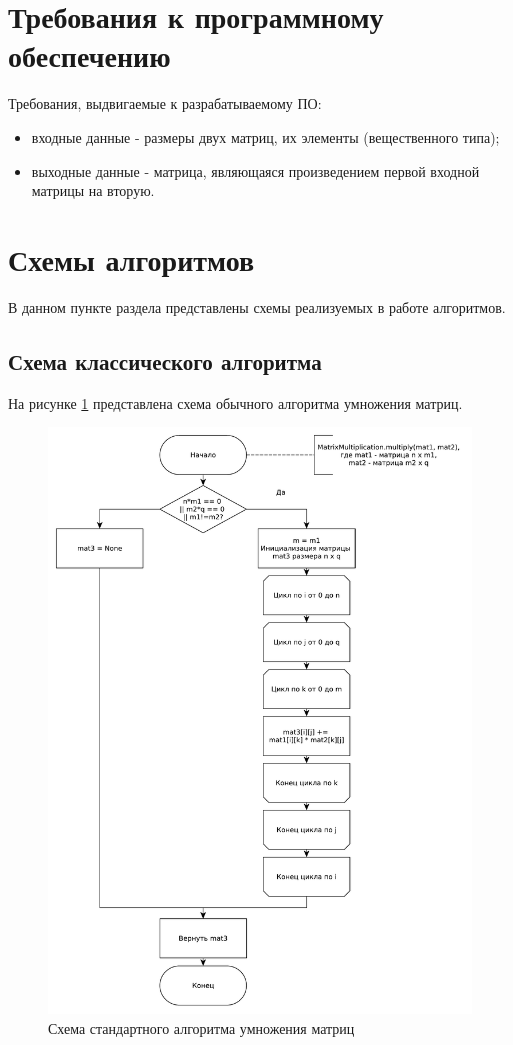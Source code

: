 \documentclass[a4paper,oneside,14pt]{extreport}
\begin{document}
\section{Требования к программному обеспечению}
Требования, выдвигаемые к разрабатываемому ПО:
\begin{itemize}
	\item входные данные - размеры двух матриц, их элементы (вещественного типа);
	\item выходные данные - матрица, являющаяся произведением первой входной матрицы на вторую.
\end{itemize}

\section{Схемы алгоритмов}
В данном пункте раздела представлены схемы реализуемых в работе алгоритмов.
\subsection{Схема классического алгоритма}
На рисунке \ref{fig:matmult} представлена схема обычного алгоритма умножения матриц.

\begin{figure}[H]
	\centering
	\includegraphics[width=1\linewidth]{images/MatrixMultiplication}
	\caption{Схема стандартного алгоритма умножения матриц}
	\label{fig:matmult}
\end{figure}
\end{document}
